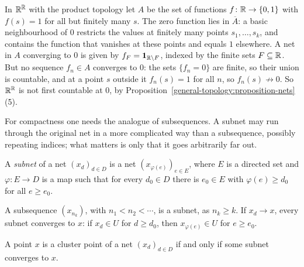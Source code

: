 \begin{example}\label{general-topology:example-pointwise-closure}
In $\mathbb{R}^{\mathbb{R}}$ with the product topology let $A$ be the set of functions $f \colon \mathbb{R} \to \{0, 1\}$ with $f(s) = 1$ for all but finitely many $s$. The zero function lies in $\overline{A}$: a basic
neighbourhood of $0$ restricts the values at finitely many points $s_1, \ldots, s_k$, and contains the function that vanishes at these points and equals $1$ elsewhere. A net in $A$ converging to $0$
is given by $f_F = \mathbf{1}_{\mathbb{R} \setminus F}$, indexed by the finite sets $F \subseteq \mathbb{R}$. But no sequence $f_n \in A$ converges to $0$: the sets $\{f_n = 0\}$ are finite, so their union is
countable, and at a point $s$ outside it $f_n(s) = 1$ for all $n$, so $f_n(s) \not\to 0$. So $\mathbb{R}^{\mathbb{R}}$ is not first countable at $0$, by Proposition~\ref{general-topology:proposition-nets}(5).
\end{example}

For compactness one needs the analogue of subsequences. A subnet may run through the original net in a more complicated way than a subsequence, possibly repeating indices; what matters is only that it goes
arbitrarily far out.

\begin{definition}\label{general-topology:definition-subnet}
A \emph{subnet} of a net $(x_d)_{d \in D}$ is a net $(x_{\varphi(e)})_{e \in E}$, where $E$ is a directed set and $\varphi \colon E \to D$ is a map such that for every $d_0 \in D$ there is $e_0 \in E$ with
$\varphi(e) \geq d_0$ for all $e \geq e_0$.
\end{definition}

A subsequence $(x_{n_k})$, with $n_1 < n_2 < \cdots$, is a subnet, as $n_k \geq k$. If $x_d \to x$, every subnet converges to $x$: if $x_d \in U$ for $d \geq d_0$, then $x_{\varphi(e)} \in U$ for $e \geq e_0$.

\begin{lemma}\label{general-topology:lemma-cluster-subnet}
A point $x$ is a cluster point of a net $(x_d)_{d \in D}$ if and only if some subnet converges to $x$.
\end{lemma}

